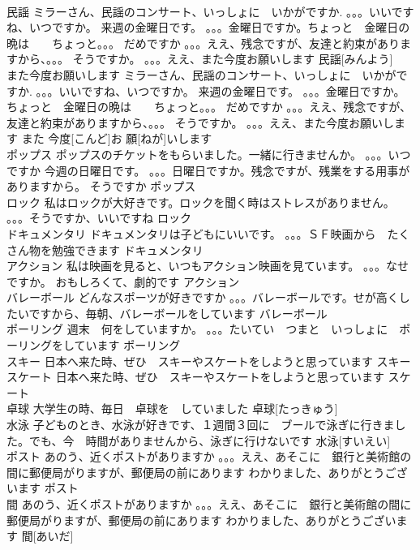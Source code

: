 \documentclass[8pt]{extreport}
\begin{document}
\begin{CJK}{UTF8}{min}
\\	民謡	ミラーさん、民謡のコンサート、いっしょに　いかがですか. 。。。いいですね、いつですか。 来週の金曜日です。 。。。金曜日ですか。ちょっと　金曜日の晩は　　ちょっと。。。 だめですか 。。。ええ、残念ですが、友達と約束がありますから、。。。 そうですか。 。。。ええ、また今度お願いします	民謡[みんよう]			
\\	また今度お願いします	ミラーさん、民謡のコンサート、いっしょに　いかがですか. 。。。いいですね、いつですか。 来週の金曜日です。 。。。金曜日ですか。ちょっと　金曜日の晩は　　ちょっと。。。 だめですか 。。。ええ、残念ですが、友達と約束がありますから、。。。 そうですか。 。。。ええ、また今度お願いします	また 今度[こんど]お 願[ねが]いします			
\\	ポップス	ポップスのチケットをもらいました。一緒に行きませんか。 。。。いつですか 今週の日曜日です。 。。。日曜日ですか。残念ですが、残業をする用事がありますから。 そうですか	ポップス						
\\	ロック	私はロックが大好きです。ロックを聞く時はストレスがありません。 。。。そうですか、いいですね	ロック						
\\	ドキュメンタリ	ドキュメンタリは子どもにいいです。 。。。ＳＦ映画から　たくさん物を勉強できます	ドキュメンタリ			
\\	アクション	私は映画を見ると、いつもアクション映画を見ています。 。。。なせですか。 おもしろくて、劇的です	アクション			
\\	バレーボール	どんなスポーツが好きですか 。。。バレーボールです。せが高くしたいですから、毎朝、バレーボールをしています	バレーボール			
\\	ポーリング	週末　何をしていますか。 。。。たいてい　つまと　いっしょに　ポーリングをしています	ポーリング						
\\	スキー	日本へ来た時、ぜひ　スキーやスケートをしようと思っています	スキー						
\\	スケート	日本へ来た時、ぜひ　スキーやスケートをしようと思っています	スケート						
\\	卓球	大学生の時、毎日　卓球を　していました	卓球[たっきゅう]			
\\	水泳	子どものとき、水泳が好きです、１週間３回に　ブールで泳ぎに行きました。でも、今　時間がありませんから、泳ぎに行けないです	水泳[すいえい]			
\\	ポスト	あのう、近くポストがありますか 。。。ええ、あそこに　銀行と美術館の間に郵便局がりますが、郵便局の前にあります わかりました、ありがとうございます	ポスト			
\\	間	あのう、近くポストがありますか 。。。ええ、あそこに　銀行と美術館の間に郵便局がりますが、郵便局の前にあります わかりました、ありがとうございます	間[あいだ]			

\end{CJK}
\end{document}
